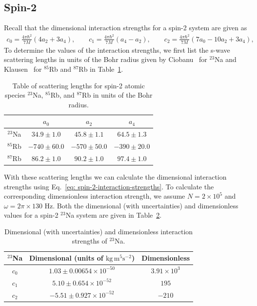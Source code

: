 \subsection{Spin-2}
Recall that the dimensional interaction strengths for a spin-2 system are given
as
\begin{align}\label{eq: spin-2-interaction-strengths}
    c_0 = \frac{4\pi\hbar^2}{7M}(4a_2+3a_4), \qquad
    c_1 = \frac{4\pi\hbar^2}{7M}(a_4-a_2), \qquad
    c_2 = \frac{4\pi\hbar^2}{7M}(7a_0-10a_2+3a_4),
\end{align}
To determine the values of the interaction strengths, we first list the s-wave
scattering lengths in units of the Bohr radius given by
Ciobanu~\cite{Ciobanu2000} for \( ^{23}\)Na and Klausen~\cite{Klausen2001} for
\( ^{85}\)Rb and \( ^{87}\)Rb in Table~\ref{table: scaterring-lengths-spin-2}.
\begin{table}[htbp]
    \centering
    \begin{tabular}{ cccc } 
     \toprule
      & \(a_0\) & \(a_2\) & \(a_4\) \\
      \midrule
      \( ^{23}\)Na & \(34.9\pm 1.0\) & \(45.8\pm 1.1\) & \(64.5\pm 1.3\) \\ 
      \( ^{85}\)Rb  & \(-740\pm60.0\) & \(-570\pm 50.0\) & \(-390\pm20.0\) \\ 
      \( ^{87}\)Rb & \(86.2\pm 1.0\) & \(90.2\pm 1.0\) & \(97.4\pm 1.0\) \\
      \bottomrule
    \end{tabular}
    \caption{\label{table: scaterring-lengths-spin-2}Table of scattering lengths
    for spin-2 atomic species \( ^{23}\)Na, \( ^{85}\)Rb, and \( ^{87}\)Rb in
    units of the Bohr radius.}
\end{table}
With these scattering lengths we can calculate the dimensional interaction
strengths using Eq.~\eqref{eq: spin-2-interaction-strengths}.
To calculate the corresponding dimensionless interaction strength, we assume
\(N = 2\times10^5\) and \(\omega = 2\pi \times 130\) Hz.
Both the dimensional (with uncertainties) and dimensionless values for a spin-2
\( ^{23}\)Na system are given in
Table~\ref{table: spin-2-interactions-sodium}.
\begin{table}[!htbp]
    \centering
    \begin{tabular}{ccc}
        \toprule
        \( ^{23}\)Na & Dimensional (units of \(\text{kg}\, \text{m}^5
        \text{s}^{-2}\)) & Dimensionless \\
        \midrule
        \(c_0\) & \(1.03 \pm 0.00654 \times 10^{-50}\) & \(3.91\times10^3\) \\
        \(c_1\) & \(5.10 \pm 0.654 \times 10^{-52}\) & \(195\) \\
        \(c_2\) & \(-5.51 \pm 0.927 \times 10^{-52}\) & \(-210\) \\
        \bottomrule
    \end{tabular}
    \caption{\label{table: spin-2-interactions-sodium}Dimensional (with
    uncertainties) and dimensionless interaction strengths of \( ^{23}\)Na.}
\end{table}
